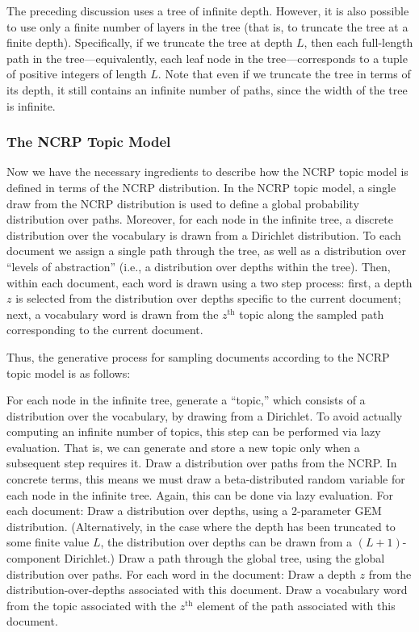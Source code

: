 \documentclass{article}
\newcommand{\nth}{^{\text{th}}}
\begin{document}
The preceding discussion uses a tree of infinite depth.
However, it is also possible to use only a finite number of layers in the tree (that is, to truncate the tree at a finite depth).
Specifically, if we truncate the tree at depth $L$, then each full-length path in the tree---equivalently, each leaf node in the tree---corresponds to a tuple of positive integers of length $L$.
Note that even if we truncate the tree in terms of its depth, it still contains an infinite number of paths, since the width of the tree is infinite.

\subsubsection{The NCRP Topic Model}

Now we have the necessary ingredients to describe how the NCRP topic model is defined in terms of the NCRP distribution.
In the NCRP topic model, a single draw from the NCRP distribution is used to define a global probability distribution over paths.
Moreover, for each node in the infinite tree, a discrete distribution over the vocabulary is drawn from a Dirichlet distribution.
To each document we assign a single path through the tree, as well as a distribution over ``levels of abstraction'' (i.e., a distribution over depths within the tree).
Then, within each document, each word is drawn using a two step process: first, a depth $z$ is selected from the distribution over depths specific to the current document; next, a vocabulary word is drawn from the $z\nth$ topic along the sampled path corresponding to the current document.

Thus, the generative process for sampling documents according to the NCRP topic model is as follows:
\begin{outline}
\1 For each node in the infinite tree, generate a ``topic,'' which consists of a distribution over the vocabulary, by drawing from a Dirichlet.
To avoid actually computing an infinite number of topics, this step can be performed via lazy evaluation.
That is, we can generate and store a new topic only when a subsequent step requires it.
%
\1 Draw a distribution over paths from the NCRP.
In concrete terms, this means we must draw a beta-distributed random variable for each node in the infinite tree.
Again, this can be done via lazy evaluation.
%
\1 For each document:
  \2 Draw a distribution over depths, using a 2-parameter GEM distribution.  (Alternatively, in the case where the depth has been truncated to some finite value $L$, the distribution over depths can be drawn from a $(L+1)$-component Dirichlet.)
  \2 Draw a path through the global tree, using the global distribution over paths.
  \2 For each word in the document:
    \3 Draw a depth $z$ from the distribution-over-depths associated with this document.
    \3 Draw a vocabulary word from the topic associated with the $z\nth$ element of the path associated with this document.
\end{outline}
\end{document}
